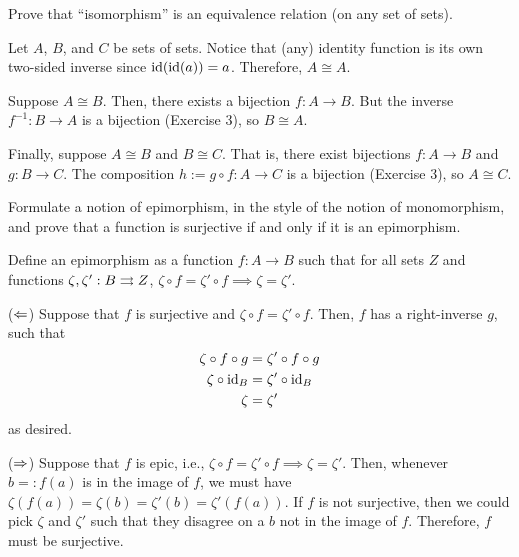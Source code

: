 \documentclass[notes,tikz]{agony}
\begin{document}
\begin{xca}
  Prove that ``isomorphism'' is an equivalence relation (on any set of sets).
\end{xca}
\begin{sol}
  Let $A$, $B$, and $C$ be sets of sets.
  Notice that (any) identity function is its own two-sided inverse since $\operatorname{id}(\operatorname{id}(a)) = a$.
  Therefore, $A \cong A$.

  Suppose $A \cong B$. Then, there exists a bijection $f : A \to B$.
  But the inverse $f^{-1} : B \to A$ is a bijection (Exercise 3), so $B \cong A$.

  Finally, suppose $A \cong B$ and $B \cong C$.
  That is, there exist bijections $f : A \to B$ and $g : B \to C$.
  The composition $h := g \circ f : A \to C$ is a bijection (Exercise 3), so $A \cong C$.
\end{sol}

\begin{xca}
  Formulate a notion of epimorphism, in the style of the notion of monomorphism,
  and prove that a function is surjective if and only if it is an epimorphism.
\end{xca}
\begin{sol}
  Define an epimorphism as a function $f : A \to B$ such that for all sets $Z$
  and functions $\zeta, \zeta' : B \rightrightarrows Z$, $\zeta \circ f = \zeta' \circ f \implies \zeta = \zeta'$.

  ($\Leftarrow$) Suppose that $f$ is surjective and $\zeta \circ f = \zeta' \circ f$.
  Then, $f$ has a right-inverse $g$, such that
  \begin{align*}
    \zeta \circ f \circ g & = \zeta' \circ f \circ g \\
    \zeta \circ \operatorname{id}_B     & = \zeta' \circ \operatorname{id}_B     \\
    \zeta                 & = \zeta'
  \end{align*}
  as desired.

  ($\Rightarrow$) Suppose that $f$ is epic, i.e.,
  $\zeta \circ f = \zeta' \circ f \implies \zeta = \zeta'$.
  Then, whenever $b =: f(a)$ is in the image of $f$,
  we must have $\zeta(f(a)) = \zeta(b) = \zeta'(b) = \zeta'(f(a))$.
  If $f$ is not surjective, then we could pick $\zeta$ and $\zeta'$
  such that they disagree on a $b$ not in the image of $f$.
  Therefore, $f$ must be surjective.
\end{sol}

\end{document}
